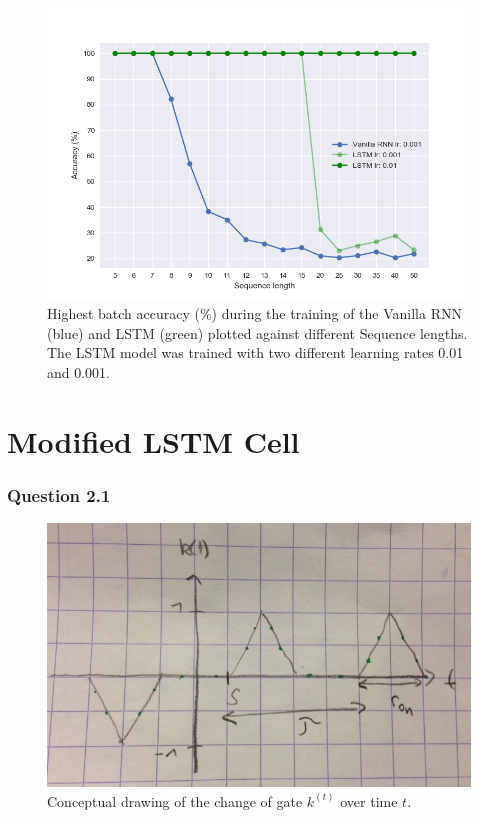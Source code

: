 \documentclass{article}
\begin{document}
\begin{figure}[h!]
    \centering
  \centering
  \includegraphics[scale=0.45]{Figure_1}
  \caption{Highest batch accuracy (\%) during the training of the Vanilla RNN (blue) and LSTM (green) plotted against different Sequence lengths. The LSTM model was trained with two different learning rates 0.01 and 0.001. }
  \label{rnn_lstm_comparison}
\end{figure}
\newpage
\section*{Modified LSTM Cell}
\subsubsection*{Question 2.1}
\begin{figure}[h!]
    \centering
  \centering
  \includegraphics[scale=0.3]{sketch}
  \caption{Conceptual drawing of the change of gate $k^{(t)}$ over time $t$.}
\end{figure}
\end{document}
